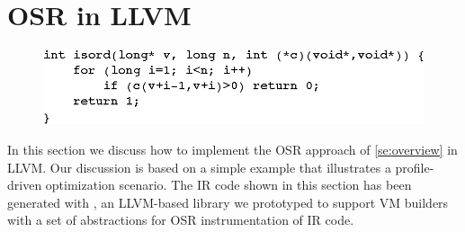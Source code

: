 
\section{OSR in LLVM}
\label{se:osr-llvm}


\ifdefined\noauthorea
\begin{figure}[t]
\begin{center}
\includegraphics[width=0.9\columnwidth]{figures/isord-example/isord.eps}
\caption{\protect}
\end{center}
\end{figure}
\fi

In this section we discuss how to implement the OSR approach of \mysection\ref{se:overview} in LLVM. Our discussion is based on a simple example that illustrates a profile-driven optimization scenario. The IR code shown in this section has been generated with \osrkit, an LLVM-based library we prototyped to support VM builders with a set of abstractions for OSR instrumentation of IR code.

